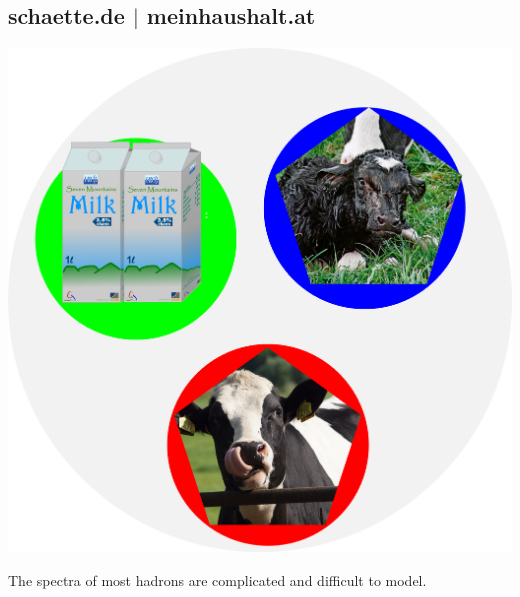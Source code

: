 \appendix


\subsection{schaette.de $|$ meinhaushalt.at}
\begin{frame}
\begin{minipage}{0.6\textwidth}
\includegraphics[width=\textwidth]{Figures Lecture on Hadrons/Hadron_with_pictures.png}
\end{minipage}
\begin{minipage}{0.38\textwidth}
The spectra of most hadrons are complicated and difficult to model.
\end{minipage}

\end{frame}
\subsection{}
